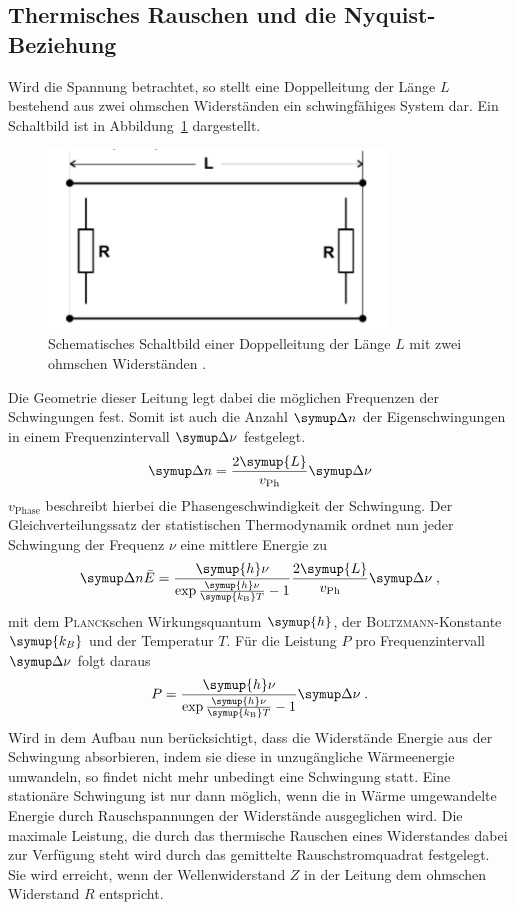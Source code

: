 \subsection{Thermisches Rauschen und die Nyquist-Beziehung}
%
Wird die Spannung betrachtet, so stellt eine Doppelleitung der Länge $L$ bestehend aus zwei ohmschen Widerständen ein schwingfähiges System dar. Ein Schaltbild ist in Abbildung~\ref{fig:doppelleitung} dargestellt.
%
\begin{figure}
  \includegraphics[width=0.8\textwidth]{figures/Doppelleitung.pdf}
  \caption{Schematisches Schaltbild einer Doppelleitung der Länge $L$ mit zwei ohmschen Widerständen \cite{V57}.}
  \label{fig:doppelleitung}
\end{figure}
%
Die Geometrie dieser Leitung legt dabei die möglichen Frequenzen der Schwingungen fest. Somit ist auch die Anzahl $\upD n$ der Eigenschwingungen in einem Frequenzintervall $\upD\nu$ festgelegt.
%
\begin{equation}
  \upD n=\frac{2\symup{L}}{v_\text{Ph}}\upD\nu
\end{equation}
%
$v_\text{Phase}$ beschreibt hierbei die Phasengeschwindigkeit der Schwingung. Der Gleichverteilungssatz der statistischen Thermodynamik ordnet nun jeder Schwingung der Frequenz $\nu$ eine mittlere Energie zu
%
\begin{equation}
  \upD n\bar{E}=\frac{\symup{h}\nu}{\exp{\frac{\symup{h}\nu}{\symup{k_\text{B}}T}}-1}\frac{2\symup{L}}{v_\text{Ph}}\upD\nu \; ,
\end{equation}
%
mit dem \textsc{Planck}schen Wirkungsquantum $\symup{h}$, der \textsc{Boltzmann}-Konstante $\symup{k_B}$ und der Temperatur $T$. Für die Leistung $P$ pro Frequenzintervall $\upD\nu$ folgt daraus
%
\begin{equation}
  P=\frac{\symup{h}\nu}{\exp{\frac{\symup{h}\nu}{\symup{k_\text{B}}T}}-1}\upD\nu\; .
\end{equation}
%
Wird in dem Aufbau nun berücksichtigt, dass die Widerstände Energie aus der Schwingung absorbieren, indem sie diese in unzugängliche Wärmeenergie umwandeln, so findet nicht mehr unbedingt eine Schwingung statt. Eine stationäre Schwingung ist nur dann möglich, wenn die in Wärme umgewandelte Energie durch Rauschspannungen der Widerstände ausgeglichen wird. Die maximale Leistung, die durch das thermische Rauschen eines Widerstandes dabei zur Verfügung steht wird durch das gemittelte Rauschstromquadrat festgelegt. Sie wird erreicht, wenn der Wellenwiderstand $Z$ in der Leitung dem ohmschen Widerstand $R$ entspricht.
